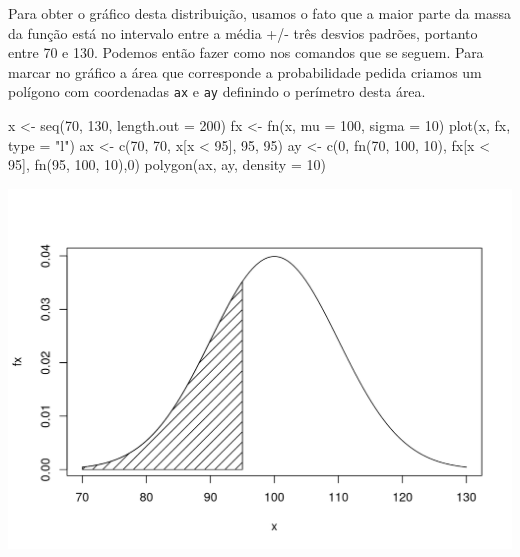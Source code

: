 \documentclass[
  10pt,
  a4paper]{book}
\newenvironment{Shaded}{\begin{snugshade}}{\end{snugshade}}
\newcommand{\AttributeTok}[1]{\textcolor[rgb]{0.77,0.63,0.00}{#1}}
\newcommand{\DecValTok}[1]{\textcolor[rgb]{0.00,0.00,0.81}{#1}}
\newcommand{\FunctionTok}[1]{\textcolor[rgb]{0.00,0.00,0.00}{#1}}
\newcommand{\NormalTok}[1]{#1}
\newcommand{\OtherTok}[1]{\textcolor[rgb]{0.56,0.35,0.01}{#1}}
\newcommand{\SpecialCharTok}[1]{\textcolor[rgb]{0.00,0.00,0.00}{#1}}
\newcommand{\StringTok}[1]{\textcolor[rgb]{0.31,0.60,0.02}{#1}}
\begin{document}
Para obter o gráfico desta distribuição, usamos o fato que
a maior parte da massa da função está no intervalo entre a média +/- três
desvios padrões, portanto entre 70 e 130. Podemos então fazer como nos
comandos que se seguem. Para marcar no gráfico a área que corresponde a
probabilidade pedida criamos um polígono com coordenadas \texttt{ax} e \texttt{ay}
definindo o perímetro desta área.

\begin{Shaded}
\begin{Highlighting}[]
\NormalTok{x }\OtherTok{\textless{}{-}} \FunctionTok{seq}\NormalTok{(}\DecValTok{70}\NormalTok{, }\DecValTok{130}\NormalTok{, }\AttributeTok{length.out =} \DecValTok{200}\NormalTok{)}
\NormalTok{fx }\OtherTok{\textless{}{-}} \FunctionTok{fn}\NormalTok{(x, }\AttributeTok{mu =} \DecValTok{100}\NormalTok{, }\AttributeTok{sigma =} \DecValTok{10}\NormalTok{)}
\FunctionTok{plot}\NormalTok{(x, fx, }\AttributeTok{type =} \StringTok{"l"}\NormalTok{)}
\NormalTok{ax }\OtherTok{\textless{}{-}} \FunctionTok{c}\NormalTok{(}\DecValTok{70}\NormalTok{, }\DecValTok{70}\NormalTok{, x[x }\SpecialCharTok{\textless{}} \DecValTok{95}\NormalTok{], }\DecValTok{95}\NormalTok{, }\DecValTok{95}\NormalTok{)}
\NormalTok{ay }\OtherTok{\textless{}{-}} \FunctionTok{c}\NormalTok{(}\DecValTok{0}\NormalTok{, }\FunctionTok{fn}\NormalTok{(}\DecValTok{70}\NormalTok{, }\DecValTok{100}\NormalTok{, }\DecValTok{10}\NormalTok{), fx[x }\SpecialCharTok{\textless{}} \DecValTok{95}\NormalTok{], }\FunctionTok{fn}\NormalTok{(}\DecValTok{95}\NormalTok{, }\DecValTok{100}\NormalTok{, }\DecValTok{10}\NormalTok{),}\DecValTok{0}\NormalTok{)}
\FunctionTok{polygon}\NormalTok{(ax, ay, }\AttributeTok{density =} \DecValTok{10}\NormalTok{)}
\end{Highlighting}
\end{Shaded}

\begin{center}\includegraphics{figures/unnamed-chunk-366-1} \end{center}
\end{document}
